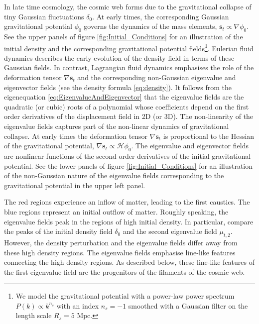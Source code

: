 \documentclass[a4paper, 11pt]{article}
\begin{document}
\begin{framed}
In late time cosmology, the cosmic web forms due to the gravitational collapse of tiny Gaussian fluctuations $\delta_0$. At early times, the corresponding Gaussian gravitational potential $\phi_0$ governs the dynamics of the mass elements, $\bm{s}_t \propto \nabla \phi_0$. See the upper panels of figure \ref{fig:Initial_Conditions} for an illustration of the initial density and the corresponding gravitational potential fields\footnote{We model the gravitational potential with a power-law power spectrum $P(k) \propto k^{n_s}$ with an index $n_s=-1$ smoothed with a Gaussian filter on the length scale $R_s=5\text{ Mpc}$.}. Eulerian fluid dynamics describes the early evolution of the density field in terms of these Gaussian fields. In contrast, Lagrangian fluid dynamics emphasises the role of the deformation tensor $\nabla \bm{s}_t$ and the corresponding non-Gaussian eigenvalue and eigenvector fields (see the density formula \eqref{eq:density}). It follows from the eigenequation \eqref{eq:EigenvalueAndEigenvector} that the eigenvalue fields are the quadratic (or cubic) roots of a polynomial whose coefficients depend on the first order derivatives of the displacement field in 2D (or 3D). The non-linearity of the eigenvalue fields captures part of the non-linear dynamics of gravitational collapse. At early times the deformation tensor $\nabla \bm{s}_t$ is proportional to the Hessian of the gravitational potential, $\nabla \bm{s}_t \propto \mathcal{H}\phi_0$. The eigenvalue and eigenvector fields are nonlinear functions of the second order derivatives of the initial gravitational potential. See the lower panels of figure \ref{fig:Initial_Conditions} for an illustration of the non-Gaussian nature of the eigenvalue fields corresponding to the gravitational potential in the upper left panel. 

The red regions experience an inflow of matter, leading to the first caustics. The blue regions represent an initial outflow of matter. Roughly speaking, the eigenvalue fields peak in the regions of high initial density. In particular, compare the peaks of the initial density field $\delta_0$ and the second eigenvalue field $\mu_{t,2}$. However, the density perturbation and the eigenvalue fields differ away from these high density regions. The eigenvalue fields emphasise line-like features connecting the high density regions. As described below, these line-like features of the first eigenvalue field are the progenitors of the filaments of the cosmic web. 
\end{framed}
\end{document}
